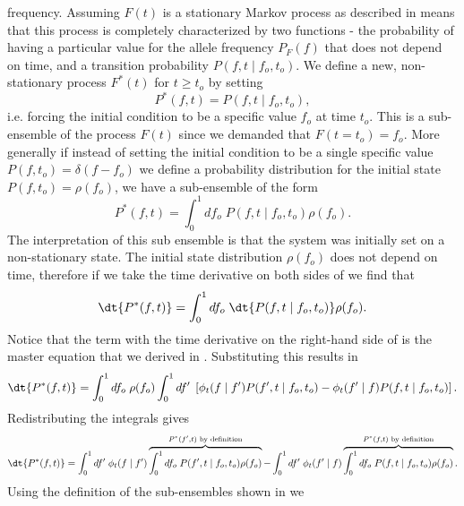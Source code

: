 frequency. Assuming $F(t)$ is a stationary Markov process as described in
 means that this process is completely
characterized by two functions - the probability of having a particular value
for the allele frequency $P_F(f)$ that does not depend on time, and a
transition probability $P(f, t \mid f_o, t_o)$. We define a new, non-stationary
process $F^*(t)$ for $t \geq t_o$ by setting
\begin{equation}
  P^*(f, t) = P(f, t\mid f_o, t_o),
\end{equation}
i.e. forcing the initial condition to be a specific value $f_o$ at time $t_o$.
This is a sub-ensemble of the process $F(t)$ since we demanded that $F(t = t_o)
= f_o$. More generally if instead of setting the initial condition to be a
single specific value $P(f, t_o) = \delta(f - f_o)$ we define a probability
distribution for the initial state $P(f, t_o) = \rho(f_o)$, we have a
sub-ensemble of the form
\begin{equation}
  P^*(f, t) = \int_0^1 df_o \; P(f, t\mid f_o, t_o) \rho(f_o).
  \label{eq_subensemble}
\end{equation}
The interpretation of this sub ensemble is that the system was initially set on
a non-stationary state. The initial state distribution $\rho(f_o)$ does not
depend on time, therefore if we take the time derivative on both sides of
 we find that
\begin{equation}
  \dt{P^*(f, t)} = \int_0^1 df_o \; \dt{P(f, t\mid f_o, t_o)}
                        \rho(f_o).
\label{eq_subensemble_dt}
\end{equation}
Notice that the term with the time derivative on the right-hand side of
 is the master equation that we derived in
. Substituting this results in
\begin{equation}
  \dt{P^*(f, t)} = \int_0^1 df_o \; \rho(f_o)
  \int_0^1 df' \;
  \left[ \phi_t(f \mid f') P(f', t \mid f_o, t_o) -
  \phi_t(f' \mid f) P(f, t \mid f_o, t_o) \right].
\end{equation}
Redistributing the integrals gives
\begin{equation}
  \dt{P^*(f, t)} = \int_0^1 df' \; \phi_t(f \mid f')
  \overbrace{
  \int_0^1 df_o \; P(f', t \mid f_o, t_o) \rho(f_o)}
  ^{P^*(f', t)\text{ by definition}} -
  \int_0^1 df' \; \phi_t(f' \mid f)
  \overbrace{
  \int_0^1 df_o \; P(f, t \mid f_o, t_o) \rho(f_o)}
  ^{P^*(f, t)\text{ by definition}}.
\end{equation}
Using the definition of the sub-ensembles shown in  we

